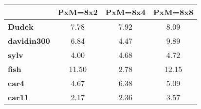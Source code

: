 \begin{tabular}{|l|c|c|c|}
\hline
&\textbf{PxM=8x2}&\textbf{PxM=8x4}&\textbf{PxM=8x8}\\\hline
\textbf{Dudek}&7.78&7.92&8.09\\\hline
\textbf{davidin300}&6.84&4.47&9.89\\\hline
\textbf{sylv}&4.00&4.68&4.72\\\hline
\textbf{fish}&11.50&2.78&12.15\\\hline
\textbf{car4}&4.67&6.38&5.09\\\hline
\textbf{car11}&2.17&2.36&3.57\\\hline
\end{tabular}
